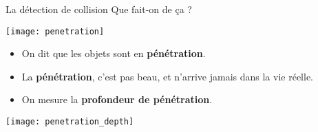 \begin{frame}{La détection de collision}
    Que fait-on de ça ?
    \begin{center}
        \texttt{[image: penetration]}
    \end{center}
    \pause
    \begin{itemize}
        \item On dit que les objets sont en \textbf{pénétration}.
            \pause
        \item La \textbf{pénétration}, c’est pas beau, et n’arrive jamais dans
            la vie réelle.
            \pause
        \item On mesure la \textbf{profondeur de pénétration}.
    \end{itemize}
    \begin{center}
        \texttt{[image: penetration\_depth]}
    \end{center}
\end{frame}

